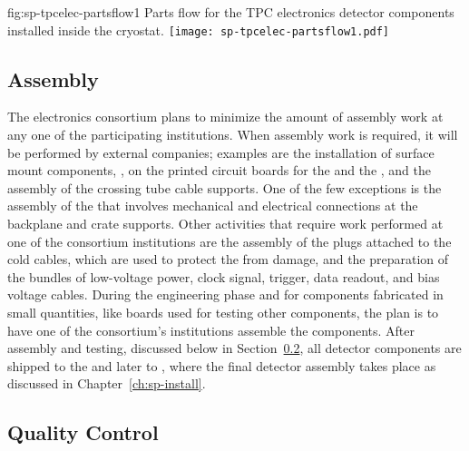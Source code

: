 \begin{dunefigure}
{fig:sp-tpcelec-partsflow1}
{Parts flow for the TPC electronics detector components installed inside the cryostat.}
\texttt{[image: sp-tpcelec-partsflow1.pdf]}
\end{dunefigure}


\subsection{Assembly}
\label{sec:fdsp-tpcelec-production-assembly}

The  electronics consortium plans to minimize
the amount of assembly work at any one of the participating
institutions. When assembly work is required, it will be performed
by external companies; examples are the installation of surface 
mount components, ,  on the printed 
circuit boards for the  and the , and
the assembly of the crossing tube cable supports. One of the few
exceptions is the assembly of the  that involves
mechanical and electrical connections at the backplane and crate supports.
Other activities that require 
work performed at one of the consortium institutions are the
assembly of the plugs attached to the cold cables, which are used to protect
the  from  damage, and the preparation of
the bundles of low-voltage power, clock signal, trigger, data readout,
and bias voltage cables. During the engineering
phase and for components fabricated in small quantities, 
like boards used for testing other components, the plan is to
have one of the consortium's institutions assemble the components.
After assembly and testing, discussed below in Section~\ref{sec:fdsp-tpcelec-production-qc},
all detector components are shipped to the  and
later to , where the final detector assembly
takes place as discussed in Chapter~\ref{ch:sp-install}.

\subsection{Quality Control}
\label{sec:fdsp-tpcelec-production-qc}

